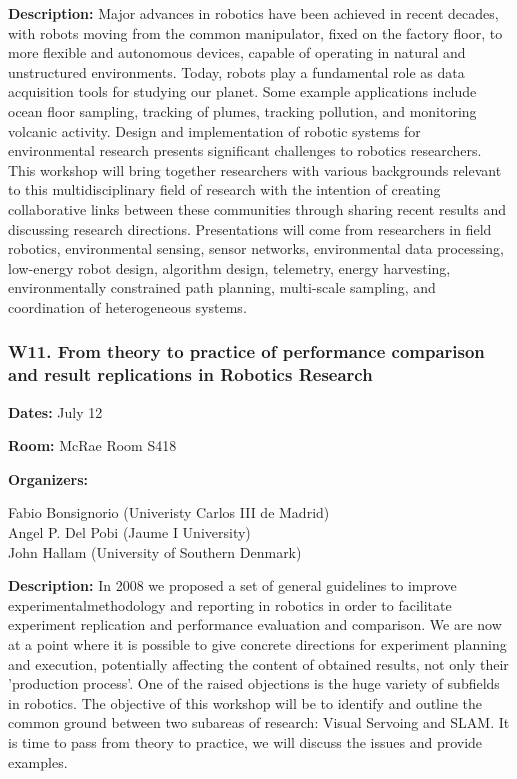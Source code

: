 \bigskip
{\bf Description:}
Major advances in robotics have been achieved in recent decades, with robots moving from the common manipulator, fixed on the factory floor, to more flexible and autonomous devices, capable of operating in natural and unstructured environments. Today, robots play a fundamental role as data acquisition tools for studying our planet. Some example applications include ocean floor sampling, tracking of plumes, tracking pollution, and monitoring volcanic activity. Design and implementation of robotic systems for environmental research presents significant challenges to robotics researchers. This workshop will bring together researchers with various backgrounds relevant to this multidisciplinary field of research with the intention of creating collaborative links between these communities through sharing recent results and discussing research directions. Presentations will come from researchers in field robotics, environmental sensing, sensor networks, environmental data processing, low-energy robot design, algorithm design, telemetry, energy harvesting, environmentally constrained path planning, multi-scale sampling, and coordination of heterogeneous systems.


\subsubsection*{ W11.   From theory to practice of performance comparison and result replications in Robotics Research}

{\bf Dates:} July 12


{\bf Room:} McRae Room S418

\bigskip
{\bf Organizers:}

Fabio Bonsignorio (Univeristy Carlos III de Madrid)\\
Angel P. Del Pobi (Jaume I University)\\
John Hallam (University of Southern Denmark)

\bigskip
{\bf Description:}
In 2008 we proposed a set of general guidelines to improve experimentalmethodology and reporting in robotics in order to facilitate experiment replication and performance evaluation and comparison.
We are now at a point where it is possible to give concrete directions for experiment planning and execution, potentially affecting the content of obtained results, not only their 'production process'.
One of the raised objections is the huge variety of subfields in robotics.
The objective of this workshop will be to identify and outline the common ground between two subareas of research: Visual Servoing and SLAM.
It is time to pass from theory to practice, we will discuss the issues and provide examples.


